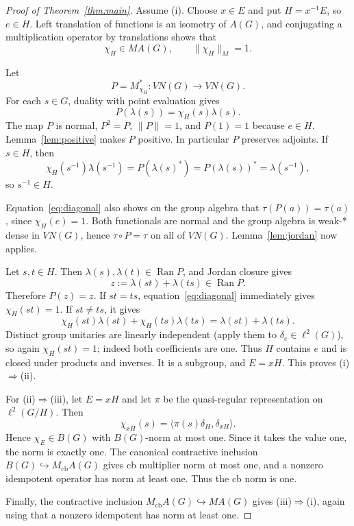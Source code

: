\documentclass[11pt]{article}
\newcommand{\Ran}{\operatorname{Ran}}
\newcommand{\Mcb}{M_{\mathrm{cb}}}
\begin{document}
\begin{proof}[Proof of Theorem~\ref{thm:main}]
Assume (i). Choose $x\in E$ and put $H=x^{-1}E$, so $e\in H$. Left
translation of functions is an isometry of $A(G)$, and conjugating a
multiplication operator by translations shows that
\[
 \chi_H\in MA(G),\qquad \|\chi_H\|_M=1.
\]

Let
\[
 P=M_{\chi_H}^*:VN(G)\longrightarrow VN(G).
\]
For each $s\in G$, duality with point evaluation gives
\begin{equation}\label{eq:diagonal}
 P(\lambda(s))=\chi_H(s)\lambda(s).
\end{equation}
The map $P$ is normal, $P^2=P$, $\|P\|=1$, and $P(1)=1$ because $e\in H$.
Lemma~\ref{lem:positive} makes $P$ positive.  In particular $P$ preserves
adjoints.  If $s\in H$, then
\[
 \chi_H(s^{-1})\lambda(s^{-1})
 =P(\lambda(s)^*)=P(\lambda(s))^*=\lambda(s^{-1}),
\]
so $s^{-1}\in H$.

Equation~\eqref{eq:diagonal} also shows on the group algebra that
$\tau(P(a))=\tau(a)$, since $\chi_H(e)=1$.  Both functionals are normal and
the group algebra is weak-* dense in $VN(G)$, hence $\tau\circ P=\tau$ on all
of $VN(G)$. Lemma~\ref{lem:jordan} now applies.

Let $s,t\in H$. Then $\lambda(s),\lambda(t)\in\Ran P$, and Jordan closure
gives
\[
 z:=\lambda(st)+\lambda(ts)\in\Ran P.
\]
Therefore $P(z)=z$. If $st=ts$, equation~\eqref{eq:diagonal} immediately
gives $\chi_H(st)=1$. If $st\ne ts$, it gives
\[
 \chi_H(st)\lambda(st)+\chi_H(ts)\lambda(ts)
 =\lambda(st)+\lambda(ts).
\]
Distinct group unitaries are linearly independent (apply them to
$\delta_e\in\ell^2(G)$), so again $\chi_H(st)=1$; indeed both coefficients
are one. Thus $H$ contains $e$ and is closed under products and inverses.
It is a subgroup, and $E=xH$. This proves (i)$\Rightarrow$(ii).

For (ii)$\Rightarrow$(iii), let $E=xH$ and let $\pi$ be the quasi-regular
representation on $\ell^2(G/H)$. Then
\[
 \chi_{xH}(s)=\langle \pi(s)\delta_H,\delta_{xH}\rangle.
\]
Hence $\chi_E\in B(G)$ with $B(G)$-norm at most one. Since it takes the value
one, the norm is exactly one. The canonical contractive inclusion
$B(G)\hookrightarrow\Mcb A(G)$ gives cb multiplier norm at most one, and a
nonzero idempotent operator has norm at least one. Thus the cb norm is one.

Finally, the contractive inclusion $\Mcb A(G)\hookrightarrow MA(G)$ gives
(iii)$\Rightarrow$(i), again using that a nonzero idempotent has norm at least
one.
\end{proof}
\end{document}
